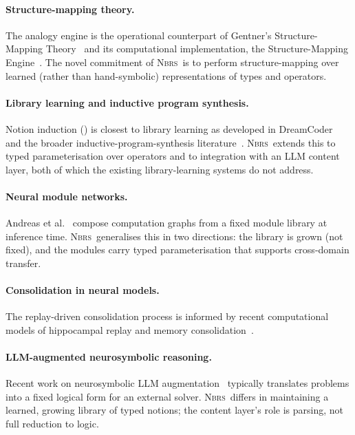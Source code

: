 \documentclass[11pt,a4paper]{article}
\theoremstyle{plain}
\theoremstyle{definition}
\theoremstyle{remark}
\newcommand{\NBRS}{\textsc{Nbrs}}
\begin{document}
\paragraph{Structure-mapping theory.}
The analogy engine is the operational counterpart of Gentner's Structure-Mapping Theory~\cite{gentner1983structure} and its computational implementation, the Structure-Mapping Engine~\cite{falkenhainer1989sme}. The novel commitment of \NBRS\ is to perform structure-mapping over learned (rather than hand-symbolic) representations of types and operators.

\paragraph{Library learning and inductive program synthesis.}
Notion induction () is closest to library learning as developed in DreamCoder~\cite{ellis2021dreamcoder} and the broader inductive-program-synthesis literature~\cite{gulwani2017program}. \NBRS\ extends this to typed parameterisation over operators and to integration with an LLM content layer, both of which the existing library-learning systems do not address.

\paragraph{Neural module networks.}
Andreas et al.~\cite{andreas2016neural} compose computation graphs from a fixed module library at inference time. \NBRS\ generalises this in two directions: the library is grown (not fixed), and the modules carry typed parameterisation that supports cross-domain transfer.

\paragraph{Consolidation in neural models.}
The replay-driven consolidation process is informed by recent computational models of hippocampal replay and memory consolidation~\cite{spens2024consolidation, kumaran2016complementary}.

\paragraph{LLM-augmented neurosymbolic reasoning.}
Recent work on neurosymbolic LLM augmentation~\cite{lewis2024analogy} typically translates problems into a fixed logical form for an external solver. \NBRS\ differs in maintaining a learned, growing library of typed notions; the content layer's role is parsing, not full reduction to logic.
\end{document}
